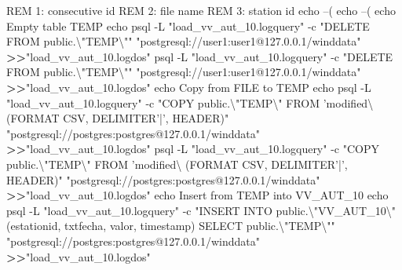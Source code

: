\documentclass[12pt,twoside]{reedthesis}
\newenvironment{Shaded}{\begin{snugshade}}{\end{snugshade}}
\newcommand{\BuiltInTok}[1]{#1}
\newcommand{\DataTypeTok}[1]{\textcolor[rgb]{0.13,0.29,0.53}{#1}}
\newcommand{\ExtensionTok}[1]{#1}
\newcommand{\NormalTok}[1]{#1}
\newcommand{\OperatorTok}[1]{\textcolor[rgb]{0.81,0.36,0.00}{\textbf{#1}}}
\newcommand{\StringTok}[1]{\textcolor[rgb]{0.31,0.60,0.02}{#1}}
\begin{document}
\vspace{0.4cm}
\begin{Shaded}
\begin{Highlighting}[]
      \ExtensionTok{REM}\NormalTok{ 1: consecutive id}
      \ExtensionTok{REM}\NormalTok{ 2: file name}
      \ExtensionTok{REM}\NormalTok{ 3: station id}
      \BuiltInTok{echo}\NormalTok{ --(%
      \BuiltInTok{echo}\NormalTok{ --(%
      \BuiltInTok{echo}\NormalTok{ Empty table TEMP}
      \BuiltInTok{echo}\NormalTok{ psql -L }\StringTok{"load_vv_aut_10.logquery"}\NormalTok{ -c }\StringTok{"DELETE FROM public.}\DataTypeTok{\textbackslash{}"}\StringTok{TEMP}\DataTypeTok{\textbackslash{}"}\StringTok{"} 
       \StringTok{"postgresql://user1:user1@127.0.0.1/winddata"} \OperatorTok{>>}\StringTok{"load_vv_aut_10.logdos"}
      \ExtensionTok{psql}\NormalTok{ -L }\StringTok{"load_vv_aut_10.logquery"}\NormalTok{ -c }\StringTok{"DELETE FROM public.}\DataTypeTok{\textbackslash{}"}\StringTok{TEMP}\DataTypeTok{\textbackslash{}"}\StringTok{"} 
       \StringTok{"postgresql://user1:user1@127.0.0.1/winddata"} \OperatorTok{>>}\StringTok{"load_vv_aut_10.logdos"}
      \BuiltInTok{echo}\NormalTok{ Copy from FILE to TEMP}
      \BuiltInTok{echo}\NormalTok{ psql -L }\StringTok{"load_vv_aut_10.logquery"}\NormalTok{ -c }\StringTok{"COPY public.}\DataTypeTok{\textbackslash{}"}\StringTok{TEMP}\DataTypeTok{\textbackslash{}"}\StringTok{ FROM 'modified\textbackslash{}%
\StringTok{       (FORMAT CSV, DELIMITER'|', HEADER)"} \StringTok{"postgresql://postgres:postgres@127.0.0.1/winddata"}
       \OperatorTok{>>}\StringTok{"load_vv_aut_10.logdos"}
      \ExtensionTok{psql}\NormalTok{ -L }\StringTok{"load_vv_aut_10.logquery"}\NormalTok{ -c }\StringTok{"COPY public.}\DataTypeTok{\textbackslash{}"}\StringTok{TEMP}\DataTypeTok{\textbackslash{}"}\StringTok{ FROM 'modified\textbackslash{}%
\StringTok{       (FORMAT CSV, DELIMITER'|', HEADER)"} \StringTok{"postgresql://postgres:postgres@127.0.0.1/winddata"} 
       \OperatorTok{>>}\StringTok{"load_vv_aut_10.logdos"}
      \BuiltInTok{echo}\NormalTok{ Insert from TEMP into VV_AUT_10}
      \BuiltInTok{echo}\NormalTok{ psql -L }\StringTok{"load_vv_aut_10.logquery"}\NormalTok{ -c }\StringTok{"INSERT INTO public.}\DataTypeTok{\textbackslash{}"}\StringTok{VV_AUT_10}\DataTypeTok{\textbackslash{}"}\StringTok{(estationid, txtfecha, valor, }
\StringTok{       timestamp) SELECT %
\StringTok{       public.}\DataTypeTok{\textbackslash{}"}\StringTok{TEMP}\DataTypeTok{\textbackslash{}"}\StringTok{"} \StringTok{"postgresql://postgres:postgres@127.0.0.1/winddata"} \OperatorTok{>>}\StringTok{"load_vv_aut_10.logdos"}
}}}}}
\end{Highlighting}
\end{Shaded}
\end{document}
